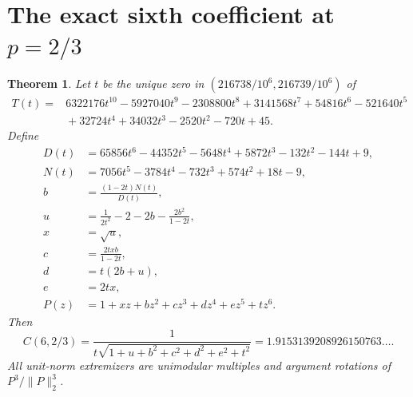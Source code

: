 \documentclass[11pt]{article}
\newtheorem{theorem}{Theorem}
\begin{document}
\section{The exact sixth coefficient at \texorpdfstring{\(p=2/3\)}{p=2/3}}
\label{sec:sixth-at-23}

\begin{theorem}
Let \(t\) be the unique zero in \((216738/10^6,216739/10^6)\) of
\begin{align*}
 T(t)={}&6322176t^{10}-5927040t^9-2308800t^8+3141568t^7
          +54816t^6-521640t^5\\
        &{}+32724t^4+34032t^3-2520t^2-720t+45.
\end{align*}
Define
\begin{align*}
 D(t)&=65856t^6-44352t^5-5648t^4+5872t^3-132t^2-144t+9,\\
 N(t)&=7056t^5-3784t^4-732t^3+574t^2+18t-9,\\
 b&=\frac{(1-2t)N(t)}{D(t)},\\
 u&=\frac{1}{2t^2}-2-2b-\frac{2b^2}{1-2t},\\
 x&=\sqrt u,\\
 c&=\frac{2txb}{1-2t},\\
 d&=t(2b+u),\\
 e&=2tx,\\
 P(z)&=1+xz+bz^2+cz^3+dz^4+ez^5+tz^6.
\end{align*}
Then
\[
 C(6,2/3)=\frac{1}{t\sqrt{1+u+b^2+c^2+d^2+e^2+t^2}}
          =1.9153139208926150763\ldots.
\]
All unit-norm extremizers are unimodular multiples and argument
rotations of \(P^3/\|P\|_2^3\).
\end{theorem}
\end{document}
